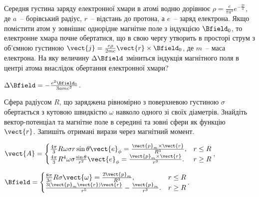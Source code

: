 
\begin{problem} %
Середня густина заряду електронної хмари в атомі водню дорівнює $\rho = \frac{e}{\pi a^3}e^{-\frac{2r}{a}}$, де $ a $~-- борівський радіус, $ r $~-- відстань до протона, а $e$~-- заряд електрона. Якщо помістити атом у зовнішнє однорідне магнітне поле з індукцією $\Bfield_0$, то електронне хмара почне обертатися, що в свою чергу утворить в просторі струм з об'ємною густиною $\vect{j} = \frac{e\rho}{2mc} \vect{r}\times \Bfield_0$, де $m$~-- маса електрона. На яку величину $\Delta\Bfield$ зміниться індукція магнітного поля в центрі атома внаслідок обертання електронної хмари?
\begin{solution}
	$\Delta\Bfield = -\frac{e^2 \Bfield_0}{3amc^2}$.
\end{solution}
\end{problem}

\begin{problem}
Сфера радіусом $R$, що заряджена рівномірно з поверхневою густиною $\sigma$ обертається з кутовою швидкістю $\omega$ навколо одного зі своїх діаметрів. Знайдіть вектор-потенціал та магнітне поле в середині та зовні сфери як функцію $\vect{r}$. Запишіть отримані вирази через магнітний момент.
\begin{solution}
	$\vect{A} =
		\begin{cases}
			\frac{4\pi}{3}R\omega\sigma r\sin\theta \vect{e}_{\phi} = \frac{\vect{p}_m\times\vect{r}}{R^3},              & r \le R \\
			\frac{4\pi}{3}R^4\omega\sigma \frac{\sin\theta}{r^2} \vect{e}_{\phi} = \frac{\vect{p}_m\times\vect{r}}{r^3}. & r \ge R \\
		\end{cases}$,

	$\Bfield =
		\begin{cases}
			\frac{8\pi}{3c}R\sigma\vect{\omega} = \frac{2\vect{p}_m}{R^3},     & r \le R \\
			\frac{3(\vect{p}_m\vect{r})\vect{r}}{r^5} -\frac{\vect{p}_m}{r^3}. & r \ge R \\
		\end{cases}$.
\end{solution}
\end{problem}

